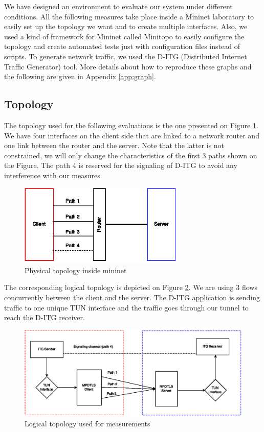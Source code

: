 We have designed an environment to evaluate our system under different conditions. All the following measures take place inside a Mininet laboratory \cite{mininet} to easily set up the topology we want and to create multiple interfaces. Also, we used a kind of framework for Mininet called Minitopo\cite{minitopo} to easily configure the topology and create automated tests just with configuration files instead of scripts. To generate network traffic, we used the D-ITG (Distributed Internet Traffic Generator)\cite{ditg} tool. More details about how to reproduce these graphs and the following are given in Appendix \ref{app:graph}.

\subsection{Topology}\label{sec:perftopo}

The topology used for the following evaluations is the one presented on Figure \ref{fig:topo-phys}. We have four interfaces on the client side that are linked to a network router and one link between the router and the server. Note that the latter is not constrained, we will only change the characteristics of the first 3 paths shown on the Figure. The path 4 is reserved for the signaling of D-ITG to avoid any interference with our measures.


\begin{figure}[!ht]
\centering
\includegraphics[width=0.7\textwidth]{images/perf-topo-phys.eps}
\caption{Physical topology inside mininet}
\label{fig:topo-phys}
\end{figure}

The corresponding logical topology is depicted on Figure \ref{fig:topo-log}. We are using 3 flows concurrently between the client and the server. The D-ITG application is sending traffic to one unique TUN interface and the traffic goes through our tunnel to reach the D-ITG receiver.

\begin{figure}[!ht]
\centering
\includegraphics[width=\textwidth]{images/perf-topo-logic.eps}
\caption{Logical topology used for measurements}
\label{fig:topo-log}
\end{figure}

